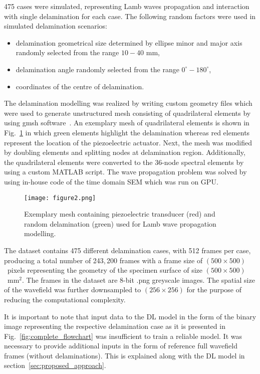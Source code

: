 475 cases were simulated, representing Lamb waves propagation and interaction 
with single delamination for each case. 
The following random factors were used in simulated delamination scenarios:
\begin{itemize}
	\item delamination geometrical size	determined by ellipse minor and major axis randomly selected from the range $10-40$ mm,
	\item delamination angle randomly selected from the range $ 0^{\circ}-180^{\circ}$,
	\item coordinates of the centre of delamination.
\end{itemize}
The delamination modelling was realized by writing custom geometry files which were used to generate unstructured mesh consisting of quadrilateral elements by using gmsh software~\cite{Geuzaine2009}.
An exemplary mesh of quadrilateral elements is shown in Fig.~\ref{fig:random_delam_mesh} in which green elements highlight the delamination whereas red elements represent the location of the piezoelectric actuator.
Next, the mesh was modified by doubling elements and splitting nodes at delamination region.
Additionally, the quadrilateral elements were converted to the 36-node spectral elements by using a custom MATLAB script.
The wave propagation problem was solved by using in-house code of the time domain SEM which was run on GPU.
\begin{figure} [h!]
	\begin{center}
		\texttt{[image: figure2.png]}
	\end{center}
	\caption{Exemplary mesh containing piezoelectric transducer (red) and random delamination (green) used for Lamb wave propagation modelling.} 
	\label{fig:random_delam_mesh}
\end{figure}
The dataset contains 475 different delamination cases, with 512 frames per case, producing a total number of 243,\,200 frames with a frame size of \((500\times500)\)~pixels representing the geometry of the specimen surface of size \((500\times500)\)~mm\(^{2}\).
The frames in the dataset are 8-bit .png greyscale images.
The spatial size of the wavefield was further downsampled to \((256\times256)\) for the purpose of 
reducing the computational complexity.

It is important to note that input data to the DL model in the form of the binary image representing the respective delamination case as it is presented in Fig.~\ref{fig:complete_flowchart} was insufficient to train a reliable model.
It was necessary to provide additional inputs in the form of reference full wavefield frames (without delaminations).
This is explained along with the DL model in section~\ref{sec:proposed_approach}.
